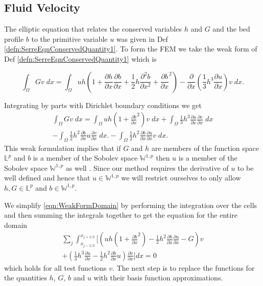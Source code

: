 \subsection{Fluid Velocity}
The elliptic equation that relates the conserved variables $h$ and $G$ and the bed profile $b$ to the primitive variable $u$ was given in Def \ref{defn:SerreEqnConservedQuantity1}. To form the FEM we take the weak form of Def \ref{defn:SerreEqnConservedQuantity1} which is 

\begin{equation*}
	\int_{\Omega } G v \; dx =  \int_{\Omega } uh \left(1 + \frac{\partial h}{\partial x}\frac{\partial b}{\partial x} + \frac{1}{2}h\frac{\partial^2 b}{\partial x^2} + \frac{\partial b}{\partial x}^2 \right) - \frac{\partial}{\partial x}\left(\frac{1}{3}h^3  \frac{\partial {u}}{\partial x}\right) v \; dx.
\end{equation*}

Integrating by parts with Dirichlet boundary conditions we get
\begin{multline}
\int_{\Omega } G v \; dx = \int_{\Omega } uh \left(1 + \frac{\partial b}{\partial x}^2 \right) v \; dx +  \int_{\Omega } \frac{1}{3}h^3  \frac{\partial {u}}{\partial x} \frac{\partial v}{\partial x} \; dx  \\ - 
\int_{\Omega }   \frac{1}{2}h^2\frac{\partial b}{\partial x} u \frac{\partial v }{\partial x}\; dx. - 
\int_{\Omega }   \frac{1}{2}h^2\frac{\partial b}{\partial x}  \frac{\partial u }{\partial x}v \; dx.
\label{eqn:WeakFormDomain}
\end{multline}
This weak formulation implies that if $G$ and $h$ are members of the function space $\mathbb{L}^p$ and $b$ is a member of the Sobolev space $\mathbb{W}^{1,p}$ then $u$ is a member of the Sobolev space $\mathbb{W}^{1,p}$ as well \cite{EvansPDE-1998}. Since our method requires the derivative of $u$ to be well defined and hence that $u \in \mathbb{W}^{1,p}$ we will restrict ourselves to only allow $h,G \in \mathbb{L}^p$ and $b \in \mathbb{W}^{1,p}$.

We simplify \eqref{eqn:WeakFormDomain} by performing the integration over the cells and then summing the integrals together to get the equation for the entire domain
\begin{multline}
\label{eq:elementwiseint}
 \sum_{j}  \int_{x_{j-1/2} }^{{x_{j+1/2}}} \Bigg[  \left( uh \left(1 + \frac{\partial b}{\partial x}^2 \right)  - \frac{1}{2}h^2\frac{\partial b}{\partial x}  \frac{\partial u }{\partial x}  -  G \right) v   \\ +  \left( \frac{1}{3}h^3  \frac{\partial {u}}{\partial x}    -     \frac{1}{2}h^2\frac{\partial b}{\partial x} u    \right) \frac{\partial v }{\partial x} \Bigg]dx  = 0
\end{multline}
which holds for all test functions $v$. The next step is to replace the functions for the quantities $h$, $G$, $b$ and $u$ with their basis function approximations. 

